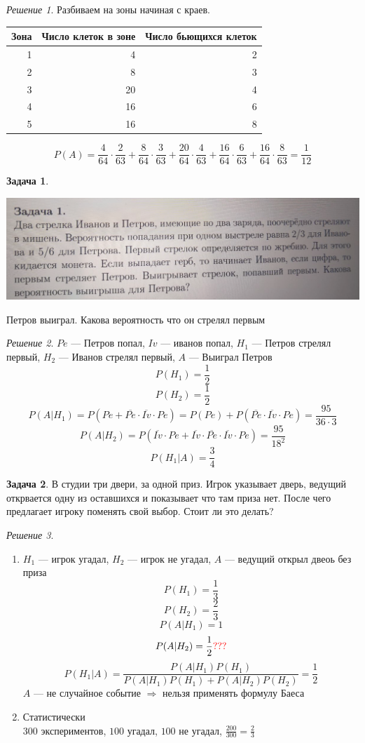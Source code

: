 \documentclass[english]{article}
\theoremstyle{plain}
\theoremstyle{remark}
\newtheorem*{solution}{Решение}
\theoremstyle{definition}
\newtheorem{task}{Задача}
\begin{document}
\begin{solution}
Разбиваем на зоны начиная с краев.
\begin{center}
\begin{tabular}{r|rr|}
Зона & Число клеток в зоне & Число бьющихся клеток\\
\hline
1 & 4 & 2\\
2 & 8 & 3\\
3 & 20 & 4\\
4 & 16 & 6\\
5 & 16 & 8\\
\end{tabular}
\end{center}
\[ P(A) = \frac{4}{64}\cdot\frac{2}{63} + \frac{8}{64}\cdot\frac{3}{63} + \frac{20}{64}\cdot\frac{4}{63} + \frac{16}{64}\cdot\frac{6}{63} + \frac{16}{64}\cdot\frac{8}{63} = \frac{1}{12} \]
\end{solution}
\begin{task}
\-
\begin{center}
\includegraphics[width=.9\linewidth]{4_1.png}
\end{center}
Петров выиграл. Какова вероятность что он стрелял первым
\end{task}
\begin{solution}
\(Pe\) --- Петров попал, \(Iv\) --- иванов попал, \(H_1\) --- Петров стрелял
первый, \(H_2\) --- Иванов стрелял первый, \(A\) --- Выиграл Петров
\[ P(H_1) = \frac{1}{2} \]
\[ P(H_2) = \frac{1}{2} \]
\[ P(A|H_1) = P(Pe + \overline{Pe}\cdot\overline{Iv}\cdot Pe) = P(Pe) + P(\overline{Pe}\cdot\overline{Iv}\cdot Pe) = \frac{95}{36\cdot 3} \]
\[ P(A|H_2) = P(\overline{Iv}\cdot Pe + \overline{Iv}\cdot\overline{Pe}\cdot\overline{Iv}\cdot Pe) = \frac{95}{18^2}\]
\[ P(H_1|A) = \frac{3}{4} \]
\end{solution}
\begin{task}
В студии три двери, за одной приз. Игрок указывает дверь, ведущий
открвается одну из оставшихся и показывает что там приза нет. После
чего предлагает игроку поменять свой выбор. Стоит ли это делать?
\end{task}
\begin{solution}
\begin{enumerate}
\item \(H_1\) --- игрок угадал, \(H_2\) --- игрок не угадал, \(A\) --- ведущий открыл двеоь без приза
\[ P(H_1) = \frac{1}{3} \]
\[ P(H_2) = \frac{2}{3} \]
\[ P(A|H_1) = 1 \]
\[ P(A|H_2) = \frac{1}{2}\color{red}??? \]
\[ P(H_1|A) = \frac{P(A|H_1)P(H_1)}{P(A|H_1)P(H_1) + P(A|H_2)P(H_2)} = \frac{1}{2} \]
\color{red} \(A\) --- не случайное событие \(\Rightarrow\) нельзя применять формулу Баеса \color{black}
\item Статистически \\
\(300\) экспериментов, \(100\) угадал, \(100\) не угадал, \(\frac{200}{300} = \frac{2}{3}\)
\end{enumerate}
\end{solution}
\end{document}
